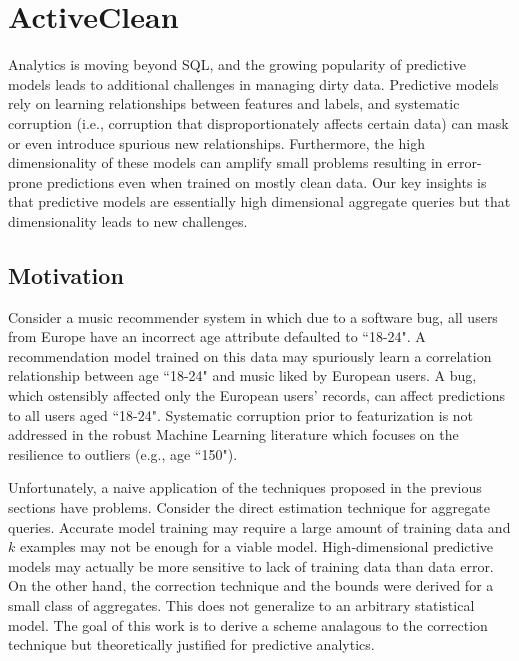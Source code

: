 \section{ActiveClean}
Analytics is moving beyond SQL, and the growing popularity of predictive models \cite{bdas, alexandrov2014stratosphere, crotty2014tupleware, hellerstein2012madlib} leads to additional challenges in managing dirty data.
Predictive models rely on learning relationships between features and labels, and systematic corruption \cite{taylor1982introduction} (i.e., corruption that disproportionately affects certain data) can mask or even introduce spurious new relationships.
Furthermore, the high dimensionality of these models can amplify small problems \cite{xiaofeature} resulting in error-prone predictions even when trained on mostly clean data.
Our key insights is that predictive models are essentially high dimensional aggregate queries but that dimensionality leads to new challenges.

\subsection{Motivation}
Consider a music recommender system in which due to a software bug, all users from Europe have an incorrect age attribute defaulted to ``18-24".
A recommendation model trained on this data may spuriously learn a correlation relationship between age ``18-24" and music liked by European users.
A bug, which ostensibly affected only the European users' records, can affect predictions to all users aged ``18-24".
Systematic corruption prior to featurization is not addressed in the robust Machine Learning literature which focuses on the resilience to outliers (e.g., age ``150").

Unfortunately, a naive application of the techniques proposed in the previous sections have problems.
Consider the direct estimation technique for aggregate queries.
Accurate model training may require a large amount of training data and $k$ examples may not be enough for a viable model.
High-dimensional predictive models may actually be more sensitive to lack of training data than data error.
On the other hand, the correction technique and the bounds were derived for a small class of aggregates.
This does not generalize to an arbitrary statistical model. 
The goal of this work is to derive a scheme analagous to the correction technique but theoretically justified for predictive analytics.

